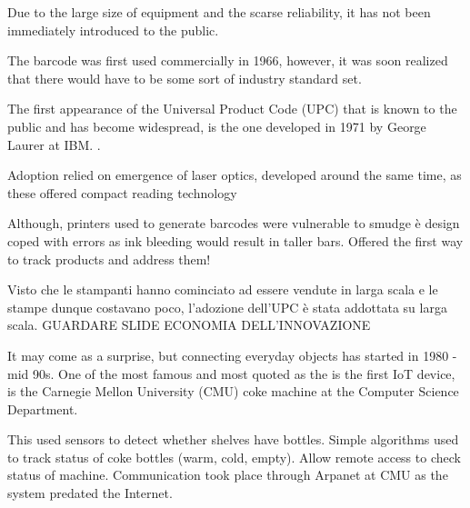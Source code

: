Due to the large size of equipment and the scarse reliability, it has not been immediately introduced to the public.

The barcode was first used commercially in 1966, however, it was soon realized that there would have to be some sort of industry standard set.

The first appearance of the Universal Product Code (UPC) that is known to the public and has become widespread, is the one developed in 1971 by George Laurer at IBM.
\cite{upc_ibm}.

Adoption relied on emergence of laser optics, developed around the same time, as these offered compact reading technology

Although, printers used to generate barcodes were vulnerable to smudge è design coped with errors as ink bleeding would result in taller bars.
Offered the first way to track products and	address them!


Visto che le stampanti hanno cominciato ad essere vendute in larga scala e le stampe dunque costavano poco, l'adozione dell'UPC è stata addottata su larga scala.
GUARDARE SLIDE ECONOMIA DELL'INNOVAZIONE




It may come as a surprise, but connecting everyday objects has started in 1980 - mid 90s.
One of the most famous and most quoted as the is the first IoT device, is the Carnegie Mellon University (CMU) coke machine at the Computer Science Department.

This used sensors to detect whether shelves have bottles.
Simple algorithms used to track status of coke bottles (warm, cold, empty).
Allow remote access to check status of machine.
Communication took place through Arpanet at CMU as the system predated the Internet.

